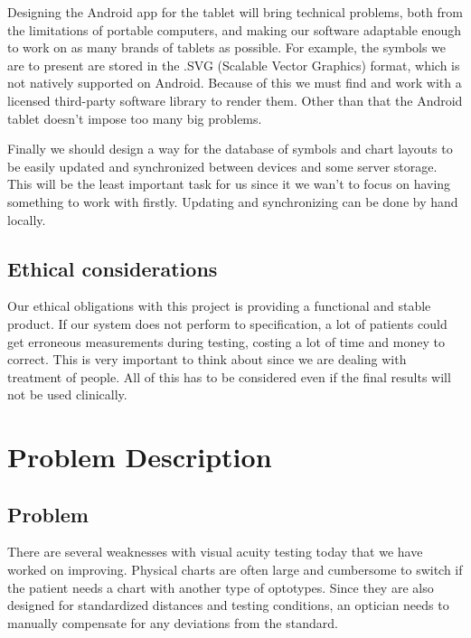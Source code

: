 \documentclass[12pt,a4paper,notitlepage]{report}
\begin{document}
Designing the Android app for the tablet will bring technical problems, both from the limitations of portable computers, and making our software adaptable enough to work on as many brands of tablets as possible. For example, the symbols we are to present are stored in the .SVG (Scalable Vector Graphics) format, which is not natively supported on Android. Because of this we must find and work with a licensed third-party software library to render them. Other than that the Android tablet doesn't impose too many big problems.

Finally we should design a way for the database of symbols and chart layouts to be easily updated and synchronized between devices and some server storage. This will be the least important task for us since it we wan't to focus on having something to work with firstly. Updating and synchronizing can be done by hand locally.

\section{Ethical considerations}
Our ethical obligations with this project is providing a functional and stable product. If our system does not perform to specification, a lot of patients could get erroneous measurements during testing, costing a lot of time and money to correct. This is very important to think about since we are dealing with treatment of people. All of this has to be considered even if the final results will not be used clinically.

\chapter{Problem Description}
\section{Problem}
There are several weaknesses with visual acuity testing today that we have worked on improving. Physical charts are often large and cumbersome to switch if the patient needs a chart with another type of optotypes. Since they are also designed for standardized distances and testing conditions, an optician needs to manually compensate for any deviations from the standard. 
\end{document}
